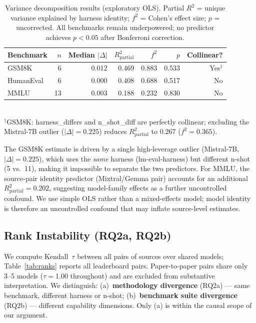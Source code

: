 \documentclass[11pt]{article}
\begin{document}
\begin{table}[t]
\centering
\small
\setlength{\tabcolsep}{3.5pt}
\caption{Variance decomposition results (exploratory OLS). Partial
$R^2$ = unique variance explained by harness identity; $f^2$ =
Cohen's effect size; $p$ = uncorrected. All benchmarks remain
underpowered; no predictor achieves $p < 0.05$ after Bonferroni
correction.}
\label{tab:variance}
\begin{tabular}{lrrrrrr}
\toprule
\textbf{Benchmark} & $n$ & \textbf{Median} $|\Delta|$ &
  $R^2_{\text{partial}}$ & $f^2$ & $p$ & \textbf{Collinear?} \\
\midrule
GSM8K      & 6  & 0.012 & 0.469 & 0.883 & 0.533 & Yes$^\dagger$ \\
HumanEval  & 6  & 0.000 & 0.408 & 0.688 & 0.517 & No  \\
MMLU       & 13 & 0.003 & 0.188 & 0.232 & 0.830 & No  \\
\bottomrule
\end{tabular}
\vspace{2pt}\\
\footnotesize $^\dagger$GSM8K: harness\_differs and n\_shot\_diff are
perfectly collinear; excluding the Mistral-7B outlier ($|\Delta|=0.225$)
reduces $R^2_{\text{partial}}$ to 0.267 ($f^2 = 0.365$).
\end{table}

The GSM8K estimate is driven by a single high-leverage outlier
(Mistral-7B, $|\Delta| = 0.225$), which uses the \emph{same} harness
(lm-eval-harness) but different n-shot (5 vs.\ 11), making it impossible
to separate the two predictors.
For MMLU, the source-pair identity predictor (Mixtral/Gemma pair) accounts
for an additional $R^2_{\text{partial}} = 0.202$, suggesting model-family
effects as a further uncontrolled confound.
We use simple OLS rather than a mixed-effects model; model identity is
therefore an uncontrolled confound that may inflate source-level estimates.

\subsection{Rank Instability (RQ2a, RQ2b)}
\label{sec:ranks}

We compute Kendall~$\tau$ between all pairs of sources over shared models;
Table~\ref{tab:ranks} reports all leaderboard pairs.
Paper-to-paper pairs share only 3--5 models ($\tau = 1.00$ throughout)
and are excluded from substantive interpretation.
We distinguish: (a)~\textbf{methodology divergence} (RQ2a) --- same
benchmark, different harness or n-shot; (b)~\textbf{benchmark suite
divergence} (RQ2b) --- different capability dimensions. Only (a) is
within the causal scope of our argument.
\end{document}
